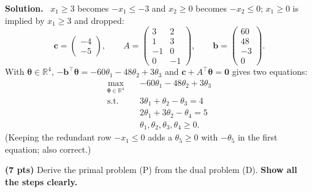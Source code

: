 \documentclass[10pt]{article}
\newenvironment{solution}
  {\par\smallskip\begingroup\color{solink}\textbf{Solution.}\ }
  {\par\endgroup}
\begin{document}
\begin{parts}
\begin{solution}
$x_1 \ge 3$ becomes $-x_1 \le -3$ and $x_2 \ge 0$ becomes $-x_2 \le 0$; $x_1 \ge 0$ is implied by
$x_1 \ge 3$ and dropped:
\[
  \bm{c} = \begin{pmatrix} -4 \\ -5 \end{pmatrix}, \qquad
  A = \begin{pmatrix} 3 & 2 \\ 1 & 3 \\ -1 & 0 \\ 0 & -1 \end{pmatrix}, \qquad
  \bm{b} = \begin{pmatrix} 60 \\ 48 \\ -3 \\ 0 \end{pmatrix}.
\]
With $\bm{\theta} \in \mathbb{R}^4$, $-\bm{b}^{\top}\bm{\theta} = -60\theta_1 - 48\theta_2 + 3\theta_3$ and
$\bm{c} + A^{\top}\bm{\theta} = \bm{0}$ gives two equations:
\[
\begin{aligned}
  \max_{\bm{\theta} \in \mathbb{R}^4} \quad & -60\theta_1 - 48\theta_2 + 3\theta_3 \\
  \text{s.t.} \quad & 3\theta_1 + \theta_2 - \theta_3 = 4 \\
                    & 2\theta_1 + 3\theta_2 - \theta_4 = 5 \\
                    & \theta_1, \theta_2, \theta_3, \theta_4 \ge 0 .
\end{aligned}
\]
(Keeping the redundant row $-x_1 \le 0$ adds a $\theta_5 \ge 0$ with $-\theta_5$ in the first
equation; also correct.)
\end{solution}

\item \textbf{(7 pts)} Derive the primal problem (P) from the dual problem (D). \textbf{Show all the steps clearly.}


\end{parts}
\end{document}
